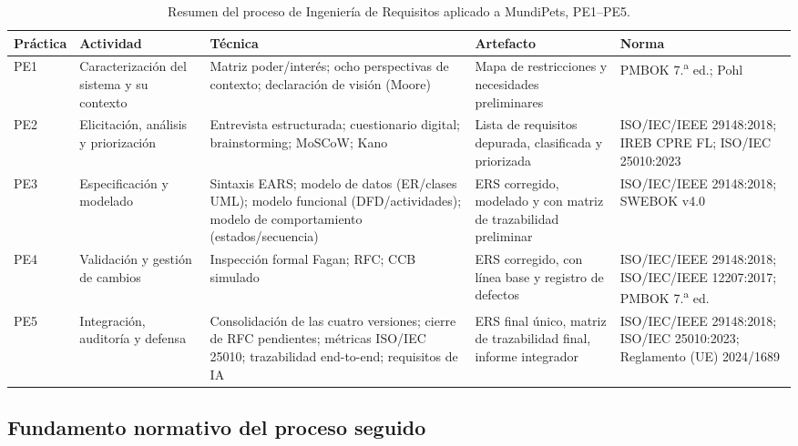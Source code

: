 \documentclass[journal,onecolumn]{IEEEtran}
\begin{document}
	\begin{table}[H]
		\centering
		\caption{Resumen del proceso de Ingeniería de Requisitos aplicado a MundiPets, PE1--PE5.}
		\label{tab:resumen-metodologia}
		\footnotesize
		\renewcommand{\arraystretch}{1.3}
		\begin{tabularx}{\textwidth}{
				|>{\raggedright\arraybackslash}p{0.9cm}
				|>{\raggedright\arraybackslash}p{2.3cm}
				|>{\raggedright\arraybackslash}X
				|>{\raggedright\arraybackslash}p{3.1cm}
				|>{\raggedright\arraybackslash}p{3.4cm}|}
			\hline
			\textbf{Práctica} & \textbf{Actividad} & \textbf{Técnica} & \textbf{Artefacto} & \textbf{Norma} \\
			\hline
			PE1 & Caracterización del sistema y su contexto & Matriz poder/interés; ocho perspectivas de contexto; declaración de visión (Moore) & Mapa de restricciones y necesidades preliminares & PMBOK 7.\textsuperscript{a} ed.; Pohl \\
			\hline
			PE2 & Elicitación, análisis y priorización & Entrevista estructurada; cuestionario digital; brainstorming; MoSCoW; Kano & Lista de requisitos depurada, clasificada y priorizada & ISO/IEC/IEEE 29148:2018; IREB CPRE FL; ISO/IEC 25010:2023 \\
			\hline
			PE3 & Especificación y modelado & Sintaxis EARS; modelo de datos (ER/clases UML); modelo funcional (DFD/actividades); modelo de comportamiento (estados/secuencia) & ERS corregido, modelado y con matriz de trazabilidad preliminar & ISO/IEC/IEEE 29148:2018; SWEBOK v4.0 \\
			\hline
			PE4 & Validación y gestión de cambios & Inspección formal Fagan; RFC; CCB simulado & ERS corregido, con línea base y registro de defectos & ISO/IEC/IEEE 29148:2018; ISO/IEC/IEEE 12207:2017; PMBOK 7.\textsuperscript{a} ed. \\
			\hline
			PE5 & Integración, auditoría y defensa & Consolidación de las cuatro versiones; cierre de RFC pendientes; métricas ISO/IEC 25010; trazabilidad end-to-end; requisitos de IA & ERS final único, matriz de trazabilidad final, informe integrador & ISO/IEC/IEEE 29148:2018; ISO/IEC 25010:2023; Reglamento (UE) 2024/1689 \\
			\hline
		\end{tabularx}
	\end{table}
	
	\subsection{Fundamento normativo del proceso seguido}
	
\end{document}
